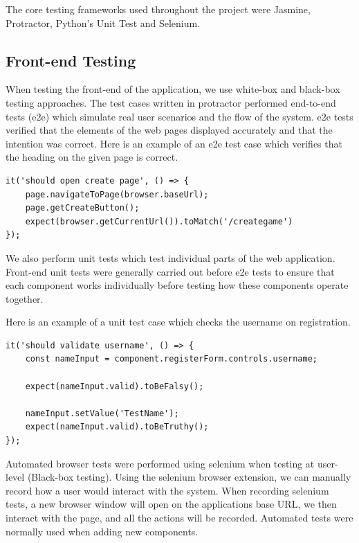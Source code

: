 The core testing frameworks used throughout the project were Jasmine, Protractor, Python's Unit Test and Selenium. 
\subsection{Front-end Testing}
When testing the front-end of the application, we use white-box and black-box testing approaches. The test cases written in protractor performed end-to-end tests (e2e) which simulate real user scenarios and the flow of the system. e2e tests verified that the elements of the web pages displayed accurately and that the intention was correct.
Here is an example of an e2e test case which verifies that the heading on the given page is correct.
\begin{verbatim}
it('should open create page', () => {
	page.navigateToPage(browser.baseUrl);
	page.getCreateButton();
	expect(browser.getCurrentUrl()).toMatch('/creategame')
});
\end{verbatim}

We also perform unit tests which test individual parts of the web application. Front-end unit tests were generally carried out before e2e tests to ensure that each component works individually before testing how these components operate together.

\newpage
Here is an example of a unit test case which checks the username on registration.
\begin{verbatim}
it('should validate username', () => {
	const nameInput = component.registerForm.controls.username;
	
	expect(nameInput.valid).toBeFalsy();
	
	nameInput.setValue('TestName');
	expect(nameInput.valid).toBeTruthy();
});
\end{verbatim}

Automated browser tests were performed using selenium when testing at user-level (Black-box testing). Using the selenium browser extension, we can manually record how a user would interact with the system. When recording selenium tests, a new browser window will open on the applications base URL, we then interact with the page, and all the actions will be recorded. Automated tests were normally used when adding new components. \hfill \break

